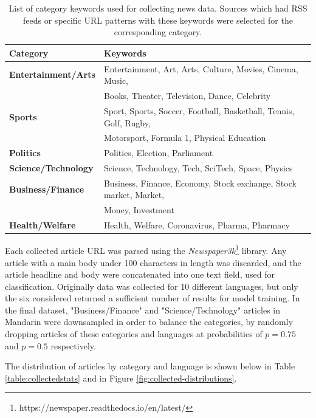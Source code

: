 \documentclass{l4proj}
\begin{document}
\begin{table}[]
\begin{tabular}{ll}
\hline
\textbf{Category}           & \textbf{Keywords}                                                 \\ \hline
\textbf{Entertainment/Arts} & Entertainment, Art, Arts, Culture, Movies, Cinema, Music,         \\
\textbf{}                   & Books, Theater, Television, Dance, Celebrity                      \\
\textbf{Sports}             & Sport, Sports, Soccer, Football, Basketball, Tennis, Golf, Rugby, \\
\textbf{}                   & Motorsport, Formula 1, Physical Education                         \\
\textbf{Politics}           & Politics, Election, Parliament                                    \\
\textbf{Science/Technology} & Science, Technology, Tech, SciTech, Space, Physics                \\
\textbf{Business/Finance}   & Business, Finance, Economy, Stock exchange, Stock market, Market, \\
\textbf{}                   & Money, Investment                                                 \\
\textbf{Health/Welfare}     & Health, Welfare, Coronavirus, Pharma, Pharmacy                    \\ \hline
\end{tabular}
\caption{List of category keywords used for collecting news data. Sources which had RSS feeds or specific URL patterns with these keywords were selected for the corresponding category.}
\label{fig:dataset_category_keywords}
\end{table}

Each collected article URL was parsed using the \emph{Newspaper3k}\footnote{https://newspaper.readthedocs.io/en/latest/} library. Any article with a main body under 100 characters in length was discarded, and the article headline and body were concatenated into one text field, used for classification. Originally data was collected for 10 different languages, but only the six considered returned a sufficient number of results for model training. In the final dataset, "Business/Finance" and "Science/Technology" articles in Mandarin were downsampled in order to balance the categories, by randomly dropping articles of these categories and languages at probabilities of $p=0.75$ and $p=0.5$ respectively. \par
The distribution of articles by category and language is shown below in Table \ref{table:collectedstats} and in Figure \ref{fig:collected-distributions}.
\end{document}
